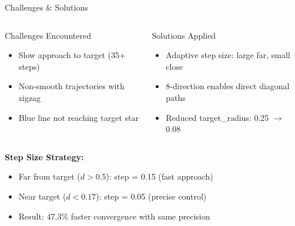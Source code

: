 \documentclass[aspectratio=169, 11pt]{beamer}
\begin{document}
\begin{frame}{Challenges \& Solutions}
    \begin{columns}[T]
        \begin{alertblock}{Challenges Encountered}
            \begin{itemize}
                \item Slow approach to target (35+ steps)
                \item Non-smooth trajectories with zigzag
                \item Blue line not reaching target star
            \end{itemize}
        \end{alertblock}
        
        \begin{exampleblock}{Solutions Applied}
            \begin{itemize}
                \item Adaptive step size: large far, small close
                \item 8-direction enables direct diagonal paths
                \item Reduced target\_radius: 0.25 $\rightarrow$ 0.08
            \end{itemize}
        \end{exampleblock}
    \end{columns}
    
    \vspace{5mm}
    \textbf{Step Size Strategy:}
    \begin{itemize}
        \item Far from target ($d > 0.5$): step = 0.15 (fast approach)
        \item Near target ($d < 0.17$): step = 0.05 (precise control)
        \item Result: 47.3\% faster convergence with same precision
    \end{itemize}
\end{frame}
\end{document}
